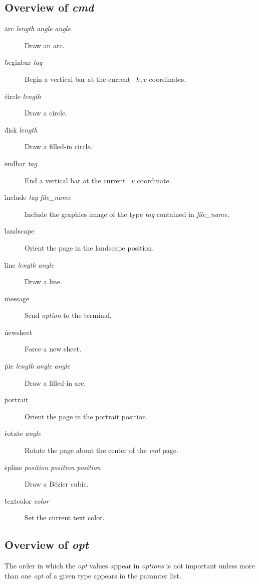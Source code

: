 \subsection{Overview of {\it cmd}}
\begin{description}
\item[\.{arc} {\it length\/} {\it angle\/} {\it angle\/}] Draw an arc.
\item[\.{beginbar} {\it tag\/}] Begin a vertical bar at the current \DVI\
         $h,v$ coordinates.
\item[\.{circle} {\it length}] Draw a circle.
\item[\.{disk} {\it length\/}] Draw a filled-in circle.
\item[\.{endbar} {\it tag\/}] End a vertical bar at the current \DVI\ $v$
         coordinate.
\item[\.{include} {\it tag\/} {\it file\_name\/}] Include the graphics
         image of the type {\it tag\/} contained in {\it file\_name.}
\item[\.{landscape}] Orient the page in the landscape position.
\item[\.{line} {\it length\/} {\it angle\/}] Draw a line.
\item[\.{message}] Send {\it option\/} to the terminal.
\item[\.{newsheet}] Force a new sheet.
\item[\.{pie} {\it length\/} {\it angle\/} {\it angle\/}] Draw a
         filled-in arc.
\item[\.{portrait}] Orient the page in the portrait position.
\item[\.{rotate} {\it angle\/}] Rotate the page about the center of the
         {\sl real\/} page.
\item[\.{spline} {\it position\/} {\it position\/} {\it position\/}] Draw
         a B\'ezier cubic.
\item[\.{textcolor} {\it color\/}] Set the current text color.
\end{description}

\subsection{Overview of {\it opt}}
The order in which the {\it opt\/} values appear in {\it options\/}
is not important unless more than one {\it opt\/} of a given type
appears in the paramter list.

